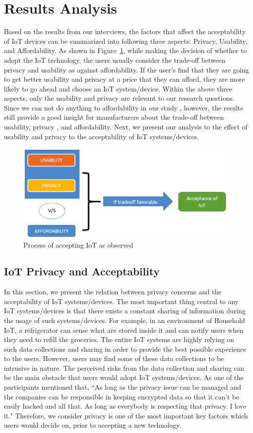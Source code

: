 \section{Results Analysis}
Based on the results from our interviews, the factors that affect the acceptability of IoT devices can be summarized into following three aspects: Privacy, Usability, and Affordability. As shown in Figure~\ref{fig:AcceptingProcess}, while making the decision of whether to adopt the IoT technology, the users usually consider the trade-off between privacy and usability as against affordability. If the user's find that they are going to get better usability and privacy at a price that they can afford, they are more likely to go ahead and choose an IoT system/device. Within the above three aspects, only the usability and privacy  are relevant to our research questions. Since we can not do anything to affordability in our study , however, the results still provide a good insight for manufacturers about the trade-off between usability, privacy , and affordability. Next, we present our analysis to the effect of usability and privacy to the acceptability of IoT systems/devices.

\begin{figure}[htb]
	\centering
	\includegraphics[width=0.6\columnwidth]{figures/AcceptingProcess.png}
	\caption{Process of accepting IoT as observed}
	\label{fig:AcceptingProcess}
\end{figure}

\subsection{IoT Privacy and Acceptability}
In this section, we present the relation between privacy concerns and the acceptability of IoT systems/devices. The most important thing central to any IoT systems/devices is that there exists a constant sharing of information during the usage of such systems/devices. For example, in an environment of Household IoT, a refrigerator can sense what are stored inside it and can notify users when they need to refill the groceries. The entire IoT systems are highly relying on such data collections and sharing in order to provide the best possible experience to the users. However, users may find some of these data collections to be intrusive in nature. The perceived risks from the data collection and sharing can be the main obstacle that users would adopt IoT systems/devices. As one of the participants mentioned that, ``As long as the privacy issue can be managed and the companies can be responsible in keeping encrypted data so that it can't be easily hacked and all that. As long as everybody is respecting that privacy. I love it." Therefore, we consider privacy is one of the most important key factors which users would decide on, prior to accepting a new technology.

